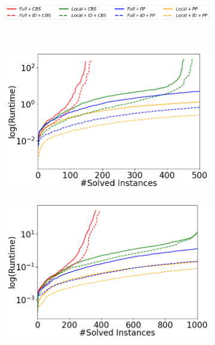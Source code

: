 \documentclass[letterpaper]{article} %
\def\
UrlFont{\rm}  %
\theoremstyle{definition}
\begin{document}
\begin{figure}[tbhp]
    \begin{subfigure}[b]{0.9\columnwidth}\centering
      \includegraphics[width=\columnwidth]{Figures/legends_cactus_dashed_lines.png}
    \end{subfigure}\\
    \centering
    \begin{subfigure}[b]{0.69\columnwidth}\centering
      \includegraphics[width=\columnwidth]{Figures/maze/mixed_small_figures/cactus_with_dashed_lines.png}
    \end{subfigure}
    \begin{subfigure}[b]{0.69\columnwidth}\centering
      \includegraphics[width=\columnwidth]{Figures/warehouse/mixed_small_figures/cactus_with_dashed_lines.png}

\end{subfigure}
\end{figure}
\end{document}
